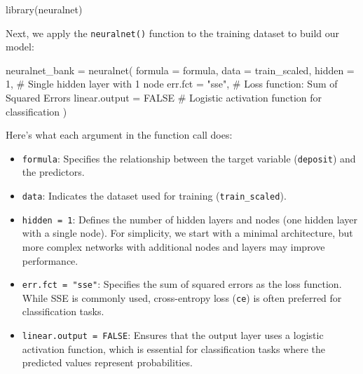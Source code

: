 \documentclass[
  11pt,
]{book}
\makeatletter
\newenvironment{Shaded}{}{}
\newcommand{\AttributeTok}[1]{#1}
\newcommand{\CommentTok}[1]{\textcolor[rgb]{0.36,0.36,0.36}{#1}}
\newcommand{\ConstantTok}[1]{#1}
\newcommand{\DecValTok}[1]{#1}
\newcommand{\FunctionTok}[1]{#1}
\newcommand{\NormalTok}[1]{#1}
\newcommand{\OtherTok}[1]{\textcolor[rgb]{0.39,0.39,0.39}{#1}}
\newcommand{\StringTok}[1]{\textcolor[rgb]{0.39,0.39,0.39}{#1}}
\providecommand{\tightlist}{%
  \setlength{\itemsep}{0pt}\setlength{\parskip}{0pt}}
\newenvironment{kframe}{%
\medskip{}
\setlength{\fboxsep}{.8em}
 \def\at@end@of@kframe{}%
 \ifinner\ifhmode%
  \def\at@end@of@kframe{\end{minipage}}%
  \begin{minipage}{\columnwidth}%
 \fi\fi%
 \def\FrameCommand##1{\hskip\@totalleftmargin \hskip-\fboxsep
 \colorbox{shadecolor}{##1}\hskip-\fboxsep
     \hskip-\linewidth \hskip-\@totalleftmargin \hskip\columnwidth}%
 \MakeFramed {\advance\hsize-\width
   \@totalleftmargin\z@ \linewidth\hsize
   \@setminipage}}%
 {\par\unskip\endMakeFramed%
 \at@end@of@kframe}
\renewenvironment{Shaded}{\begin{kframe}}{\end{kframe}}
\theoremstyle{definition}
\theoremstyle{definition}
\theoremstyle{definition}
\theoremstyle{definition}
\theoremstyle{remark}
\makeatother
\begin{document}
\begin{Shaded}
\begin{Highlighting}[]
\FunctionTok{library}\NormalTok{(neuralnet)}
\end{Highlighting}
\end{Shaded}

Next, we apply the \texttt{neuralnet()} function to the training dataset to build our model:

\begin{Shaded}
\begin{Highlighting}[]
\NormalTok{neuralnet\_bank }\OtherTok{=} \FunctionTok{neuralnet}\NormalTok{(}
  \AttributeTok{formula =}\NormalTok{ formula,}
  \AttributeTok{data =}\NormalTok{ train\_scaled,}
  \AttributeTok{hidden =} \DecValTok{1}\NormalTok{,                }\CommentTok{\# Single hidden layer with 1 node}
  \AttributeTok{err.fct =} \StringTok{"sse"}\NormalTok{,           }\CommentTok{\# Loss function: Sum of Squared Errors}
  \AttributeTok{linear.output =} \ConstantTok{FALSE}      \CommentTok{\# Logistic activation function for classification}
\NormalTok{)}
\end{Highlighting}
\end{Shaded}

Here's what each argument in the function call does:

\begin{itemize}
\tightlist
\item
  \texttt{formula}: Specifies the relationship between the target variable (\texttt{deposit}) and the predictors.\\
\item
  \texttt{data}: Indicates the dataset used for training (\texttt{train\_scaled}).\\
\item
  \texttt{hidden\ =\ 1}: Defines the number of hidden layers and nodes (one hidden layer with a single node). For simplicity, we start with a minimal architecture, but more complex networks with additional nodes and layers may improve performance.\\
\item
  \texttt{err.fct\ =\ "sse"}: Specifies the sum of squared errors as the loss function. While SSE is commonly used, cross-entropy loss (\texttt{ce}) is often preferred for classification tasks.\\
\item
  \texttt{linear.output\ =\ FALSE}: Ensures that the output layer uses a logistic activation function, which is essential for classification tasks where the predicted values represent probabilities.
\end{itemize}
\end{document}
